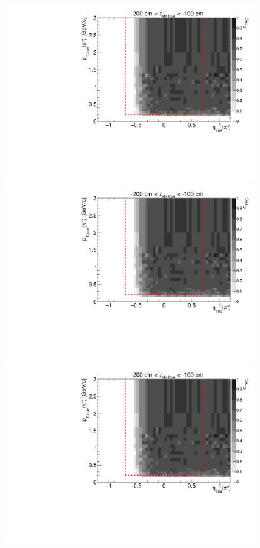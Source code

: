 \begin{figure}[hb]
{  \includegraphics[width=\linewidth,page=6]{graphics/eff/Eff2D_TPC_pion_Plus.pdf}\\
  \includegraphics[width=\linewidth,page=8]{graphics/eff/Eff2D_TPC_pion_Plus.pdf}\\
  \includegraphics[width=\linewidth,page=10]{graphics/eff/Eff2D_TPC_pion_Plus.pdf}
}%
\end{figure}
